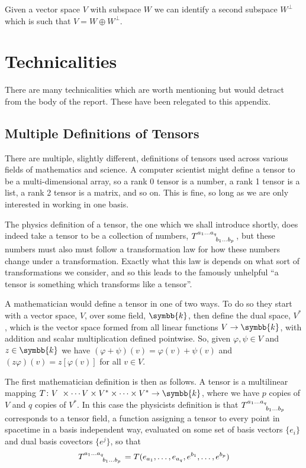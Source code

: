 \documentclass[fleqn]{NotesClass}
\renewcommand{\field}{\symbb{k}}
\renewcommand{\ve}[1]{e_{#1}}
\newcommand{\dualve}[1]{e^{#1}}
\begin{document}
\begin{appendices}
        Given a vector space \(V\) with subspace \(W\) we can identify a second subspace \(W^{\perp}\) which is such that \(V = W \oplus W^{\perp}\).
        
        
        \chapter{Technicalities}
        There are many technicalities which are worth mentioning but would detract from the body of the report.
        These have been relegated to this appendix.
        
        \section{Multiple Definitions of Tensors}\label{sec:technicalities tensor defs}
        There are multiple, slightly different, definitions of tensors used across various fields of mathematics and science.
        A computer scientist might define a tensor to be a multi-dimensional array, so a rank 0 tensor is a number, a rank 1 tensor is a list, a rank 2 tensor is a matrix, and so on.
        This is fine, so long as we are only interested in working in one basis.
        
        The physics definition of a tensor, the one which we shall introduce shortly, does indeed take a tensor to be a collection of numbers, \(\tensor{T}{^{a_1\dotso a_q}_{b_1\dotso b_p}}\), but these numbers must also must follow a transformation law for how these numbers change under a transformation.
        Exactly what this law is depends on what sort of transformations we consider, and so this leads to the famously unhelpful \enquote{a tensor is something which transforms like a tensor}.
        
        A mathematician would define a tensor in one of two ways.
        To do so they start with a vector space, \(V\), over some field, \(\field\), then define the dual space, \(V^*\), which is the vector space formed from all linear functions \(V \to \field\), with addition and scalar multiplication defined pointwise.
        So, given \(\varphi, \psi \in V\) and \(z \in \field\) we have \((\varphi + \psi)(v) = \varphi(v) + \psi(v)\) and \((z\varphi)(v) = z[\varphi(v)]\) for all \(v \in V\).
        
        The first mathematician definition is then as follows.
        A tensor is a multilinear mapping \(T \colon V\ \times \dotsm V \times V^* \times \dotsb \times V^* \to \field\), where we have \(p\) copies of \(V\) and \(q\) copies of \(V^*\).
        In this case the physicists definition is that \(\tensor{T}{^{a_1 \dotso a_q}_{b_1 \dotso b_p}}\) corresponds to a tensor field, a function assigning a tensor to every point in spacetime in a basis independent way, evaluated on some set of basis vectors \(\{\ve{i}\}\) and dual basis covectors \(\{\dualve{j}\}\), so that
        \begin{equation}
            \tensor{T}{^{a_1 \dotso a_q}_{b_1 \dotso b_p}} = T(\ve{a_1}, \dotsc, \ve{a_q}, \dualve{b_1}, \dotsc, \dualve{b_p})
        \end{equation}
        

\end{appendices}
\end{document}
